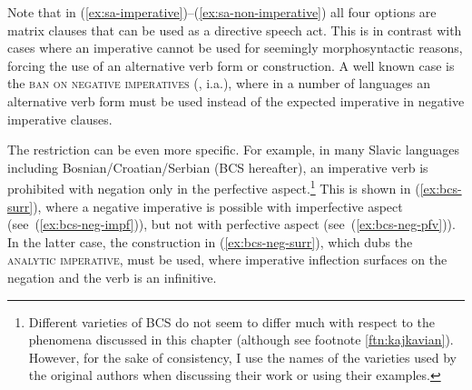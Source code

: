 \documentclass[output=paper,colorlinks,citecolor=brown]{langscibook}
\begin{document}
Note that in (\ref{ex:sa-imperative})--(\ref{ex:sa-non-imperative}) all four options are matrix clauses that can be used as a directive speech act. This is in contrast with cases where an imperative cannot be used for seemingly morphosyntactic reasons, forcing the use of an alternative verb form or construction. A well known case is the \textsc{ban on negative imperatives} (\citealt{zanuttini91,zanuttini97,rivero94,riveroterzi95,han98,han00}, i.a.), where in a number of languages an alternative verb form must be used instead of the expected imperative in negative imperative clauses. 

The restriction can be even more specific. For example, in many Slavic languages including Bosnian/Croatian/Serbian (BCS hereafter), an imperative verb is prohibited with negation only in the perfective aspect.\footnote{Different varieties of BCS do not seem to differ 
 much with respect to the phenomena discussed in this chapter (although see footnote \ref{ftn:kajkavian}). However, for the sake of consistency, I use the names of the varieties used by the original authors when discussing their work or using their examples.} This is shown in (\ref{ex:bcs-surr}), where a negative imperative is possible with imperfective aspect (see~(\ref{ex:bcs-neg-impf})), but not with perfective aspect (see~(\ref{ex:bcs-neg-pfv})). In the latter case, the construction in (\ref{ex:bcs-neg-surr}), which \citet{despic20} dubs the \textsc{analytic imperative}, must be used, where imperative inflection surfaces on the negation and the verb is an infinitive.
\ea\label{ex:bcs-surr}
\z\z
\end{document}
